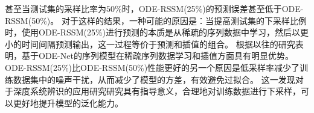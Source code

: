 甚至当测试集的采样比率为$50\%$时，ODE-RSSM(25\%)的预测误差甚至低于ODE-RSSM(50\%)。
对于这样的结果，一种可能的原因是：当提高测试集的下采样比例时，使用ODE-RSSM(25\%)进行预测的本质是从稀疏的序列数据中学习，然后以更小的时间间隔预测输出，这一过程等价于预测和插值的组合。
根据以往的研究\cite{Yildiz2019}表明，基于ODE-Net的序列模型在稀疏序列数据学习和插值方面具有明显优势。
ODE-RSSM(25\%)比ODE-RSSM(50\%)性能更好的另一个原因是低采样率减少了训练数据集中的噪声干扰，从而减少了模型的方差，有效避免过拟合。
这一发现对于深度系统辨识的应用研究研究具有指导意义，合理地对训练数据进行下采样，可以更好地提升模型的泛化能力。

